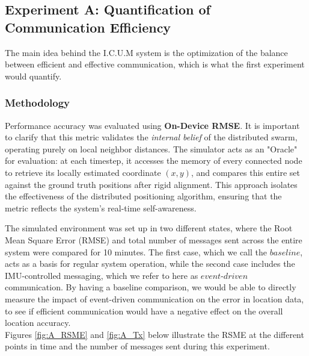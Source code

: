 \subsection{Experiment A: Quantification of Communication Efficiency}
\label{sec:exp_a}
\noindent The main idea behind the I.C.U.M system is the optimization of the balance between efficient and effective communication, which is what the first experiment would quantify.


\subsubsection{Methodology}
\noindent Performance accuracy was evaluated using \textbf{On-Device RMSE}. It is important to clarify that this metric validates the \textit{internal belief} of the distributed swarm, operating purely on local neighbor distances. The simulator acts as an "Oracle" for evaluation: at each timestep, it accesses the memory of every connected node to retrieve its locally estimated coordinate $(x,y)$, and compares this entire set against the ground truth positions after rigid alignment. This approach isolates the effectiveness of the distributed positioning algorithm, ensuring that the metric reflects the system's real-time self-awareness.

\noindent The simulated environment was set up in two different states, where the Root Mean Square Error (RMSE) and total number of messages sent across the entire system were compared for 10 minutes. The first case, which we call the $baseline$, acts as a basis for regular system operation, while the second case includes the IMU-controlled messaging, which we refer to here as $event$-$driven$ communication. By having a baseline comparison, we would be able to directly measure the impact of event-driven communication on the error in location data, to see if efficient communication would have a negative effect on the overall location accuracy. \\
Figures \ref{fig:A_RSME} and \ref{fig:A_Tx} below illustrate the RSME at the different points in time and the number of messages sent during this experiment.

